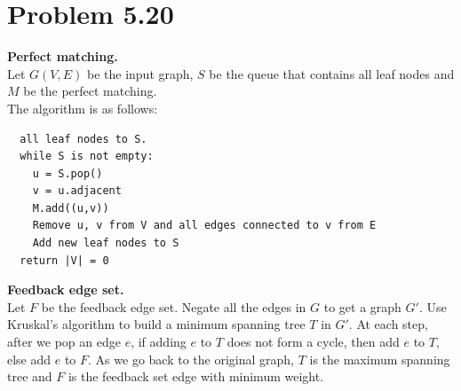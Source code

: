 \documentclass[12pt]{report}
\begin{document}
\section{Problem 5.20}
{\bf Perfect matching.} \\
Let $G(V,E)$ be the input graph, $S$ be the queue that contains all leaf nodes and $M$ be the perfect matching. \\
The algorithm is as follows:
\begin{lstlisting}
  all leaf nodes to S.
  while S is not empty:
    u = S.pop()
    v = u.adjacent
    M.add((u,v))
    Remove u, v from V and all edges connected to v from E
    Add new leaf nodes to S
  return |V| = 0
\end{lstlisting}
{\bf Feedback edge set.} \\
Let $F$ be the feedback edge set. Negate all the edges in $G$ to get a graph $G'$. Use Kruskal's algorithm to build a minimum spanning tree $T$ in $G'$. At each step, after we pop an edge $e$, if adding $e$ to $T$ does not form a cycle, then add $e$ to $T$, else add $e$ to $F$. As we go back to the original graph, $T$ is the maximum spanning tree and $F$ is the feedback set edge with minimum weight.
\end{document}
